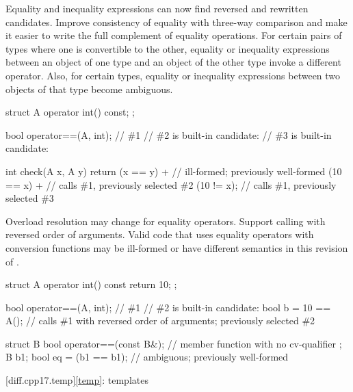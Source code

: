 \change
Equality and inequality expressions can now find
reversed and rewritten candidates.
\rationale
Improve consistency of equality with three-way comparison
and make it easier to write the full complement of equality operations.
\effect
For certain pairs of types where one is convertible to the other,
equality or inequality expressions between an object of one type
and an object of the other type invoke a different operator.
Also, for certain types, equality or inequality expressions
between two objects of that type become ambiguous.
\begin{example}
\begin{codeblock}
struct A {
  operator int() const;
};

bool operator==(A, int);        // \#1
// \#2 is built-in candidate: 
// \#3 is built-in candidate: 

int check(A x, A y) {
  return (x == y) +             // ill-formed; previously well-formed
    (10 == x) +                 // calls \#1, previously selected \#2
    (10 != x);                  // calls \#1, previously selected \#3
}
\end{codeblock}
\end{example}

\change
Overload resolution may change for equality operators.
\rationale
Support calling  with reversed order of arguments.
\effect
Valid \CppXVII{} code that uses equality operators with conversion functions
may be ill-formed or have different semantics in this revision of \Cpp{}.
\begin{example}
\begin{codeblock}
struct A {
  operator int() const { return 10; }
};

bool operator==(A, int);        // \#1
// \#2 is built-in candidate: 
bool b = 10 == A();             // calls \#1 with reversed order of arguments; previously selected \#2

struct B {
  bool operator==(const B&);    // member function with no cv-qualifier
};
B b1;
bool eq = (b1 == b1);           // ambiguous; previously well-formed
\end{codeblock}
\end{example}

[diff.cpp17.temp]{\ref{temp}: templates}

